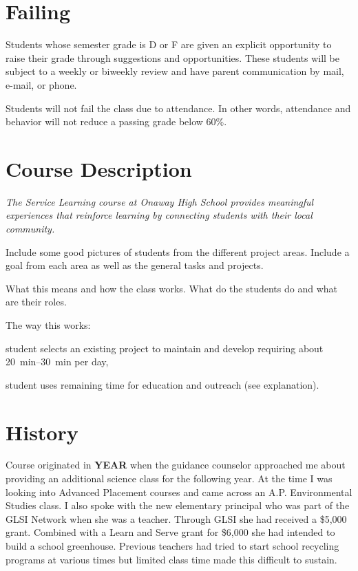 \documentclass[letterpaper,10pt]{memoir}
\begin{document}
\section*{Failing}
Students whose semester grade is D or F are given an explicit opportunity to raise their grade through suggestions and opportunities. These students will be subject to a weekly or biweekly review and have parent communication by mail, e-mail, or phone.

Students will not fail the class due to attendance. In other words, attendance and behavior will not reduce a passing grade below 60\%.






\newpage
\section*{Course Description}


\textit{The Service Learning course at Onaway High School 
 provides meaningful experiences
 that reinforce learning
 by connecting students with their local community.}

\vspace*{3mm}
 
Include some good pictures of students from the different project areas. Include a goal from each area as well as the general tasks and projects.

\vspace*{2cm}

\noindent
What this means and how the class works. What do the students do and what are their roles.

The way this works:

	student selects an existing project to maintain and develop requiring about 
  \SIrange{20}{30}{\minute} per day, 

  student uses remaining time for education and outreach (see explanation).

  
  

\newpage
\section*{History}


Course originated in \textbf{YEAR} when the guidance counselor approached me about
providing an additional science class for the following year. At the time I was
looking into Advanced Placement courses and came across an A.P. Environmental
Studies class. I also spoke with the new elementary principal who was part of the GLSI Network when she was a teacher. Through GLSI she had received a \$5,000 grant. Combined with a Learn and Serve grant for \$6,000 she had intended to build a school greenhouse. Previous teachers had tried to start school recycling programs at various times but limited class time made this difficult to sustain.
\end{document}
